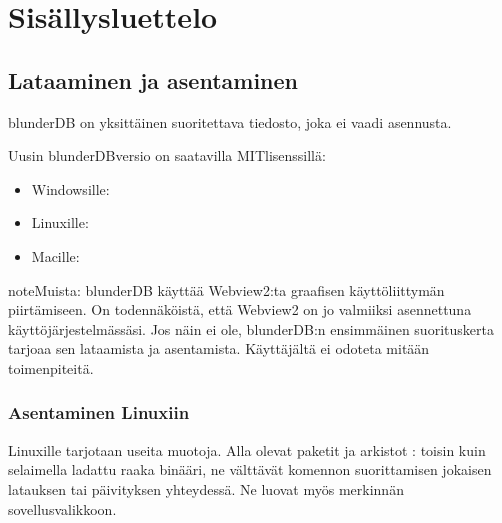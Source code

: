 \documentclass[letterpaper,10pt,finnish]{sphinxmanual}
\begin{document}
\chapter{Sisällysluettelo}
\label{\detokenize{index:sommaire}}
\sphinxstepscope


\section{Lataaminen ja asentaminen}
\label{\detokenize{telecharge_install:telechargement-et-installation}}\label{\detokenize{telecharge_install:telecharge-install}}\label{\detokenize{telecharge_install::doc}}
\sphinxAtStartPar
blunderDB on yksittäinen suoritettava tiedosto, joka ei vaadi asennusta.

\sphinxAtStartPar
Uusin blunderDB\sphinxhyphen{}versio on saatavilla MIT\sphinxhyphen{}lisenssillä:
\begin{itemize}
\item {} 
\sphinxAtStartPar
Windowsille: 

\item {} 
\sphinxAtStartPar
Linuxille: 

\item {} 
\sphinxAtStartPar
Macille: 

\end{itemize}

\begin{sphinxadmonition}{note}{Muista:}
\sphinxAtStartPar
blunderDB käyttää Webview2:ta graafisen käyttöliittymän piirtämiseen. On todennäköistä, että Webview2 on jo valmiiksi asennettuna käyttöjärjestelmässäsi. Jos näin ei ole, blunderDB:n ensimmäinen suorituskerta tarjoaa sen lataamista ja asentamista. Käyttäjältä ei odoteta mitään toimenpiteitä.
\end{sphinxadmonition}


\subsection{Asentaminen Linuxiin}
\label{\detokenize{telecharge_install:installation-sous-linux}}
\sphinxAtStartPar
Linuxille tarjotaan useita muotoja. Alla olevat paketit ja arkistot : toisin kuin selaimella ladattu raaka binääri, ne välttävät komennon  suorittamisen jokaisen latauksen tai päivityksen yhteydessä. Ne luovat myös merkinnän sovellusvalikkoon.
\end{document}
